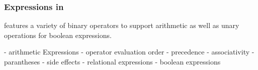 \subsubsection*{Expressions in \dazel{}}
\dazel{} features a variety of binary operators to support arithmetic as well as unary operations for boolean expressions.

- arithmetic Expressions
- operator evaluation order
	- precedence
	- associativity
	- parantheses
	- side effects
- relational expressions
- boolean expressions
